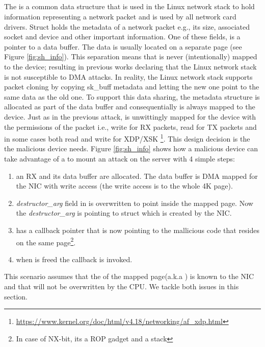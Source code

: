 \subsection{\shinfo}
The \skb is a common data structure that is used in the Linux network stack to hold information  representing a network packet and is used by all network card drivers. Struct \skb holds the metadata of a network packet e.g., its size, associated socket and device and other important information. One of these fields, is a pointer to a data buffer. The data is usually located on a separate page (see Figure \ref{fig:sh_info}). This  separation means that \skb is never (intentionally) mapped to the device; resulting in previous works \cite{thunder} declaring that the Linux network stack is not susceptible to DMA attacks. In reality, the Linux network stack supports packet cloning by copying sk\_buff metadata and letting the new one point to the same data as the old one\cite{drivers2005linux}. To support this data sharing, the \shinfo metadata structure is allocated as part of the data buffer and consequentially is always mapped to the device. Just as in the previous attack, \shinfo is unwittingly mapped for the device with the permissions of the packet i.e., write for RX packets, read for TX packets and in some cases both read and write for XDP/XSK \footnote{\url{https://www.kernel.org/doc/html/v4.18/networking/af_xdp.html}}. This design decision is the \oportunity the malicious device needs. Figure \ref{fig:sh_info} shows how a malicious device can take advantage of a \shinfo to mount an attack on the server with 4 simple steps:
\begin{enumerate}[label=(\alph*)]
    \item an RX \skb and its data buffer are allocated. The data buffer is DMA mapped for the NIC with write access (the write access is to the whole 4K page). 
    \item \textit{destructor\_arg} field in \shinfo is overwritten to point inside the mapped page. Now the \textit{destructor\_arg} is pointing to struct \uarg which is created by the NIC.
    \item \uarg has a callback pointer that is now pointing to the mallicious code that resides on the same page\footnote{In case of NX-bit, its a ROP gadget and a stack}.
    \item when \skb is freed the callback is invoked.
\end{enumerate}
This scenario assumes that the \kva of the mapped page(a.k.a \means) is known to the NIC and that \shinfo will not be overwritten by the CPU. We tackle both issues in this section.

